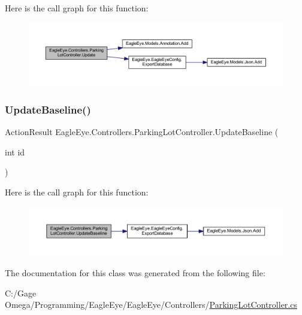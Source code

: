 Here is the call graph for this function\+:\nopagebreak
\begin{figure}[H]
\begin{center}
\leavevmode
\includegraphics[width=350pt]{class_eagle_eye_1_1_controllers_1_1_parking_lot_controller_aa0484b67b0469d5c81421d793405ac50_cgraph}
\end{center}
\end{figure}
\mbox{\label{class_eagle_eye_1_1_controllers_1_1_parking_lot_controller_a073d77794ca654b813b37deae908501a}} 
\subsubsection{\texorpdfstring{UpdateBaseline()}{UpdateBaseline()}}
{\footnotesize\ttfamily Action\+Result Eagle\+Eye.\+Controllers.\+Parking\+Lot\+Controller.\+Update\+Baseline (\begin{DoxyParamCaption}\item[{int}]{id }\end{DoxyParamCaption})}





Here is the call graph for this function\+:\nopagebreak
\begin{figure}[H]
\begin{center}
\leavevmode
\includegraphics[width=350pt]{class_eagle_eye_1_1_controllers_1_1_parking_lot_controller_a073d77794ca654b813b37deae908501a_cgraph}
\end{center}
\end{figure}


The documentation for this class was generated from the following file\+:\begin{DoxyCompactItemize}
\item 
C\+:/\+Gage Omega/\+Programming/\+Eagle\+Eye/\+Eagle\+Eye/\+Controllers/\mbox{\hyperlink{_parking_lot_controller_8cs}{Parking\+Lot\+Controller.\+cs}}\end{DoxyCompactItemize}
